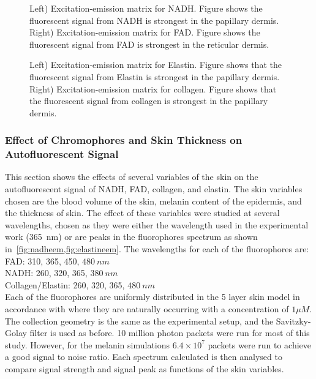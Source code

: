 \begin{figure}[!htbp]
    \centering
    \caption{Left) Excitation-emission matrix for NADH. Figure shows the fluorescent signal from NADH is strongest in the papillary dermis.
    Right) Excitation-emission matrix for FAD. Figure shows the fluorescent signal from FAD is strongest in the reticular dermis.}%
    \label{fig:nadheem}%
\end{figure}

\begin{figure}[!htbp]
    \centering
    \caption{Left) Excitation-emission matrix for Elastin. Figure shows that the fluorescent signal from Elastin is strongest in the papillary dermis.
    Right) Excitation-emission matrix for collagen. Figure shows that the fluorescent signal from collagen is strongest in the papillary dermis.}%
    \label{fig:elastineem}%
\end{figure}


\FloatBarrier
\subsubsection*{Effect of Chromophores and Skin Thickness on Autofluorescent Signal}

This section shows the effects of several variables of the skin on the autofluorescent signal of NADH, FAD, collagen, and elastin.
The skin variables chosen are the blood volume of the skin, melanin content of the epidermis, and the thickness of skin.
The effect of these variables were studied at several wavelengths, chosen as they were either the wavelength used in the experimental work (365~nm) or are peaks in the fluorophores spectrum as shown in~\cref{fig:nadheem,fig:elastineem}. 
The wavelengths for each of the fluorophores are:\\

\noindent FAD: 310, 365, 450, $480~nm$\\
NADH: 260, 320, 365, $380~nm$\\
Collagen/Elastin: 260, 320, 365, $480~nm$\\

Each of the fluorophores are uniformly distributed in the 5 layer skin model in accordance with where they are naturally occurring with a concentration of $1\mu M$.
The collection geometry is the same as the experimental setup, and the Savitzky-Golay filter is used as before.
10 million photon packets were run for most of this study.
However, for the melanin simulations $6.4\times10^7$ packets were run to achieve a good signal to noise ratio.
Each spectrum calculated is then analysed to compare signal strength and signal peak as functions of the skin variables.

